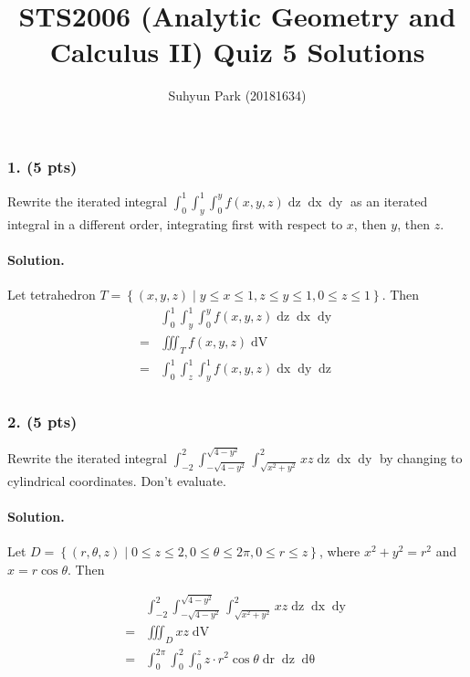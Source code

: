 
	


\title{STS2006 (Analytic Geometry and Calculus II) \newline Quiz 5 Solutions}
\author{Suhyun Park (20181634)}
\maketitle

\subsubsection{1. (5 pts)} Rewrite the iterated integral $\displaystyle \int_0^1 \int_y^1 \int_0^y f\left(x, y, z\right) \mathop{dz} \mathop{dx} \mathop{dy}$ as an iterated integral in a different order, integrating first with respect to $x$, then $y$, then $z$.

\paragraph{Solution.} Let tetrahedron $T=\left\{\left(x, y, z\right)\middle| y\leq x \leq1, z\leq y \leq1, 0\leq z \leq1\right\}$. Then
\begin{align*}
	& \int_0^1 \int_y^1 \int_0^y f\left(x, y, z\right) \mathop{dz} \mathop{dx} \mathop{dy} \\
	=& \iiint_T f\left(x, y, z\right) \mathop{dV}\\
	=& \int_0^1 \int_z^1 \int_y^1 f\left(x, y, z\right) \mathop{dx} \mathop{dy} \mathop{dz} \\
\end{align*}
\par

\subsubsection{2. (5 pts)} Rewrite the iterated integral $\displaystyle \int_{-2}^2 \int_{-\sqrt{4-y^2}}^{\sqrt{4-y^2}} \int_{\sqrt{x^2+y^2}}^2 xz \mathop{dz} \mathop{dx} \mathop{dy}$ by changing to cylindrical coordinates. Don't evaluate.

\paragraph{Solution.} Let $D=\left\{\left(r, \theta, z\right)\middle| 0\leq z\leq 2, 0\leq\theta\leq2\pi, 0\leq r\leq z\right\}$, where $x^2+y^2=r^2$ and $x=r\cos\theta$. Then

\begin{align*}
	& \int_{-2}^2 \int_{-\sqrt{4-y^2}}^{\sqrt{4-y^2}} \int_{\sqrt{x^2+y^2}}^2 xz \mathop{dz} \mathop{dx} \mathop{dy}\\
	=& \iiint_D xz \mathop{dV}\\
	=& \int_0^{2\pi} \int_0^2 \int_0^z z\cdot r^2\cos\theta \mathop{dr} \mathop{dz} \mathop{d\theta}\\
\end{align*}


